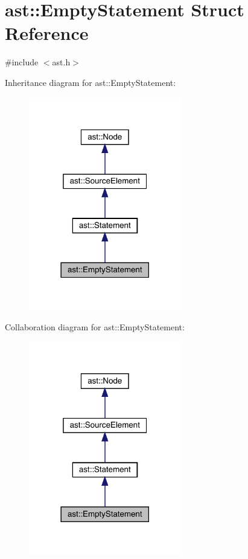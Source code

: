 \hypertarget{structast_1_1_empty_statement}{}\section{ast\+:\+:Empty\+Statement Struct Reference}
\label{structast_1_1_empty_statement}


{\ttfamily \#include $<$ast.\+h$>$}



Inheritance diagram for ast\+:\+:Empty\+Statement\+:\nopagebreak
\begin{figure}[H]
\begin{center}
\leavevmode
\includegraphics[width=189pt]{structast_1_1_empty_statement__inherit__graph}
\end{center}
\end{figure}


Collaboration diagram for ast\+:\+:Empty\+Statement\+:\nopagebreak
\begin{figure}[H]
\begin{center}
\leavevmode
\includegraphics[width=189pt]{structast_1_1_empty_statement__coll__graph}
\end{center}
\end{figure}
